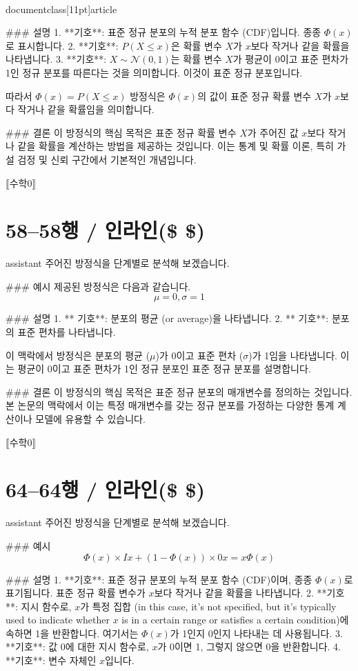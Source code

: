 \\documentclass[11pt]{article}
\begin{document}
### 설명
1. **기호**: 표준 정규 분포의 누적 분포 함수 (CDF)입니다. 종종 \(\Phi(x)\)로 표시합니다.
2. **기호**: \(P(X \le x)\)은 확률 변수 \(X\)가 \(x\)보다 작거나 같을 확률을 나타냅니다.
3. **기호**: \(X \sim \mathcal{N}(0,1)\)는 확률 변수 \(X\)가 평균이 0이고 표준 편차가 1인 정규 분포를 따른다는 것을 의미합니다. 이것이 표준 정규 분포입니다.

따라서 \(\Phi(x) = P(X \le x)\) 방정식은 \(\Phi(x)\)의 값이 표준 정규 확률 변수 \(X\)가 \(x\)보다 작거나 같을 확률임을 의미합니다.

### 결론
이 방정식의 핵심 목적은 표준 정규 확률 변수 \(X\)가 주어진 값 \(x\)보다 작거나 같을 확률을 계산하는 방법을 제공하는 것입니다. 이는 통계 및 확률 이론, 특히 가설 검정 및 신뢰 구간에서 기본적인 개념입니다.

⟦수학0⟧

\section*{58–58행 / 인라인(\$ \$) }
assistant
주어진 방정식을 단계별로 분석해 보겠습니다.

### 예시
제공된 방정식은 다음과 같습니다.
\[
\mu = 0, \sigma = 1
\]

### 설명
1. ** 기호**: 분포의 평균 (or average)을 나타냅니다.
2. ** 기호**: 분포의 표준 편차를 나타냅니다.

이 맥락에서 방정식은 분포의 평균 (\(\mu\))가 0이고 표준 편차 (\(\sigma\))가 1임을 나타냅니다. 이는 평균이 0이고 표준 편차가 1인 정규 분포인 표준 정규 분포를 설명합니다.

### 결론
이 방정식의 핵심 목적은 표준 정규 분포의 매개변수를 정의하는 것입니다. 본 논문의 맥락에서 이는 특정 매개변수를 갖는 정규 분포를 가정하는 다양한 통계 계산이나 모델에 유용할 수 있습니다.

⟦수학0⟧

\section*{64–64행 / 인라인(\$ \$) }
assistant
주어진 방정식을 단계별로 분석해 보겠습니다.

### 예시
\[
\Phi(x) \times Ix + (1 - \Phi(x)) \times 0x = x \Phi(x)
\]

### 설명
1. **기호**: 표준 정규 분포의 누적 분포 함수 (CDF)이며, 종종 \(\Phi(x)\)로 표기됩니다. 표준 정규 확률 변수가 \(x\)보다 작거나 같을 확률을 나타냅니다.
2. **기호**: 지시 함수로, \(x\)가 특정 집합 (in this case, it's not specified, but it's typically used to indicate whether \(x\) is in a certain range or satisfies a certain condition)에 속하면 1을 반환합니다. 여기서는 \(\Phi(x)\)가 1인지 0인지 나타내는 데 사용됩니다.
3. **기호**: 값 0에 대한 지시 함수로, \(x\)가 0이면 1, 그렇지 않으면 0을 반환합니다.
4. **기호**: 변수 자체인 \(x\)입니다.
\end{document}
